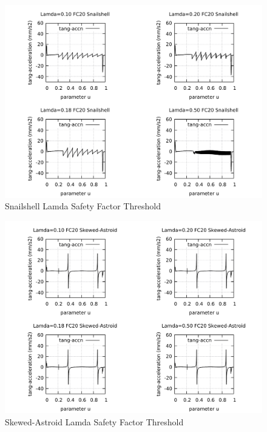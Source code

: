 \clearpage
\pagebreak
\begin{landscape}
	\begin{figure}
		\centering
		\caption  {Snailshell Lamda Safety Factor Threshold}
		\label{img-Snailshell Lamda Safety Factor Threshold}
		\includegraphics[width=1.30\textwidth]{Chap4/Lamda/img-4plots-SNAILSHELL-Lamda-010-018-020-050-FC20-Tang-Accn.pdf} 
	\end{figure}
\end{landscape}

\clearpage
\pagebreak
\begin{landscape}
	\begin{figure}
		\centering
		\caption  {Skewed-Astroid Lamda Safety Factor Threshold}
		\label{img-Skewed-Astroid Lamda Safety Factor Threshold}
		\includegraphics[width=1.30\textwidth]{Chap4/Lamda/img-4plots-SKEWED-ASTROID-Lamda-010-018-020-050-FC20-Tang-Accn.pdf} 
	\end{figure}
\end{landscape}


